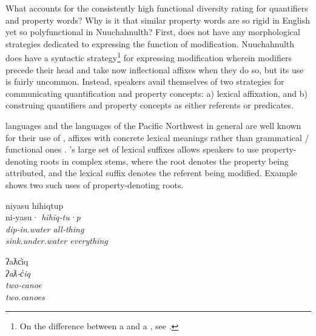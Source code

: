 What accounts for the consistently high functional diversity rating for quantifiers and property words? Why is it that similar property words are so rigid in English yet so polyfunctional in Nuuchahnulth? First,  does not have any morphological strategies dedicated to expressing the function of modification. Nuuchahnulth does have a syntactic strategy\footnote{On the difference between a  and a , see \textcites[537]{Croft2014}[380]{Croft2016}.} for expressing modification wherein modifiers precede their head and take now inflectional affixes when they do so, but its use is fairly uncommon. Instead, speakers avail themselves of two strategies for communicating quantification and property concepts: a) lexical affixation, and b) construing quantifiers and property concepts as either referents or predicates.

 languages and the languages of the Pacific Northwest in general are well known for their use of , affixes with concrete lexical meanings rather than grammatical / functional ones \parencite{Mithun1997}. 's large set of lexical suffixes allows speakers to use property-denoting roots in complex stems, where the root denotes the property being attributed, and the lexical suffix denotes the referent being modified. Example  shows two such uses of property-denoting roots.

\begin{exe}
  \ex\label{ex:4.5}
  \begin{xlist}

    \ex\label{ex:4.5a}
    \gllll niyasu           hihiqtup\\
           ni‑yasu·         \em{hihiq}‑tu·p\\
           dip‑in.water     \em{all}‑thing\\
           sink.under.water everything\\

    \ex\label{ex:4.5b}
    \gllll ʔaƛc̓iq\\
           \em{ʔaƛ}‑c̓iq\\
           \em{two}‑canoe\\
           two.canoes\\

  \end{xlist}
\end{exe}

